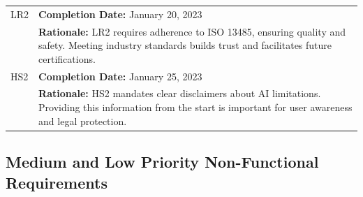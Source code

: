 \documentclass[12pt]{article}
\begin{document}
\begin{table}[H]
\begin{tabular}{p{}|p{}}
  \midrule
  LR2 & \textbf{Completion Date:} January 20, 2023\\
      & \textbf{Rationale:} LR2 requires adherence to ISO 13485, ensuring quality and safety. Meeting industry standards builds trust and facilitates future certifications. \\
  \midrule
  HS2 & \textbf{Completion Date:} January 25, 2023\\
      & \textbf{Rationale:} HS2 mandates clear disclaimers about AI limitations. Providing this information from the start is important for user awareness and legal protection. \\
  \bottomrule
  \end{tabular}
  \end{table}
  \subsection{Medium and Low Priority Non-Functional Requirements}
\end{document}
